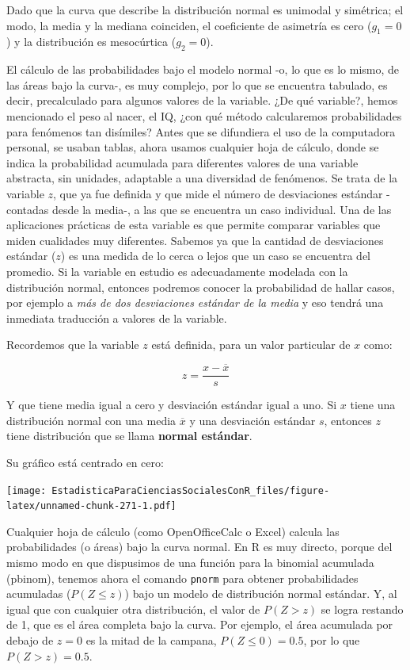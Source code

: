 \documentclass[]{book}
\begin{document}
Dado que la curva que describe la distribución normal es unimodal y
simétrica; el modo, la media y la mediana coinciden, el coeficiente de
asimetría es cero (\(g_{1}=0\)) y la distribución es mesocúrtica (\(g_{2}=0\)).

El cálculo de las probabilidades bajo el modelo normal -o, lo que es lo
mismo, de las áreas bajo la curva-, es muy complejo, por lo que se
encuentra tabulado, es decir, precalculado para algunos valores de la
variable. ¿De qué variable?, hemos mencionado el peso al nacer, el IQ,
¿con qué método calcularemos probabilidades para fenómenos tan
disímiles? Antes que se difundiera el uso de la computadora personal, se
usaban tablas, ahora usamos cualquier hoja de cálculo, donde se indica
la probabilidad acumulada para diferentes valores de una variable
abstracta, sin unidades, adaptable a una diversidad de fenómenos. Se
trata de la variable \(z\), que ya fue definida y que mide el número de
desviaciones estándar -contadas desde la media-, a las que se encuentra
un caso individual. Una de las aplicaciones prácticas de esta variable
es que permite comparar variables que miden cualidades muy diferentes.
Sabemos ya que la cantidad de desviaciones estándar (\(z\)) es una medida
de lo cerca o lejos que un caso se encuentra del promedio. Si la
variable en estudio es adecuadamente modelada con la distribución
normal, entonces podremos conocer la probabilidad de hallar casos, por
ejemplo a \emph{más de dos desviaciones estándar de la media} y eso tendrá
una inmediata traducción a valores de la variable.

Recordemos que la variable \(z\) está definida, para un valor particular
de \(x\) como:

\[z = \frac{x - \overline{x}}{s}\]

Y que tiene media igual a cero y desviación estándar igual a uno. Si \(x\)
tiene una distribución normal con una media \(\overline{x}\) y una
desviación estándar \(s\), entonces \(z\) tiene distribución que se llama
\textbf{normal estándar}.

Su gráfico está centrado en cero:

\texttt{[image: EstadisticaParaCienciasSocialesConR\_files/figure-latex/unnamed-chunk-271-1.pdf]}

Cualquier hoja de cálculo (como OpenOfficeCalc o Excel)
calcula las probabilidades (o áreas) bajo la curva normal. En R es muy directo, porque del mismo modo en que dispusimos de una función para la binomial acumulada (pbinom), tenemos ahora el comando \texttt{pnorm} para obtener probabilidades acumuladas (\(P(Z\leq z)\)) bajo un modelo de distribución normal estándar. Y, al igual que con cualquier otra distribución, el valor de \(P(Z>z)\) se logra restando de 1, que es el área completa bajo la curva. Por ejemplo, el área acumulada por debajo de \(z=0\) es la mitad de la campana, \(P(Z\leq 0)=0.5\), por lo que \(P(Z>z)=0.5\).
\end{document}
